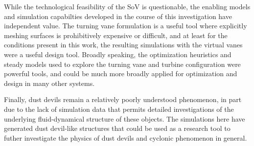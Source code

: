 While the technological feasibility of the SoV is questionable, 
the enabling models and simulation capabilties developed in the course of this 
investigation have independent value. The turning vane formulation
is a useful tool where explicitly meshing surfaces is prohibitively expensive or 
difficult, and at least for the conditions present in this work, the resulting simulations
with the virtual vanes were a useful design tool. Broadly speaking, the optimization 
heuristics and steady models used to explore the 
turning vane and turbine configuration were powerful tools, and could be much more 
broadly applied for optimization and design in many other systems. 


Finally, dust devils remain a relatively poorly understood phenomenon, in part 
due to the lack of simulation data that permits detailed investigations of the 
underlying fluid-dynamical structure of these objects. 
The simulations here have generated dust devil-like structures that could be 
used as a research tool to futher investigate the physics of dust devils and cyclonic
phenomenon in general. 





